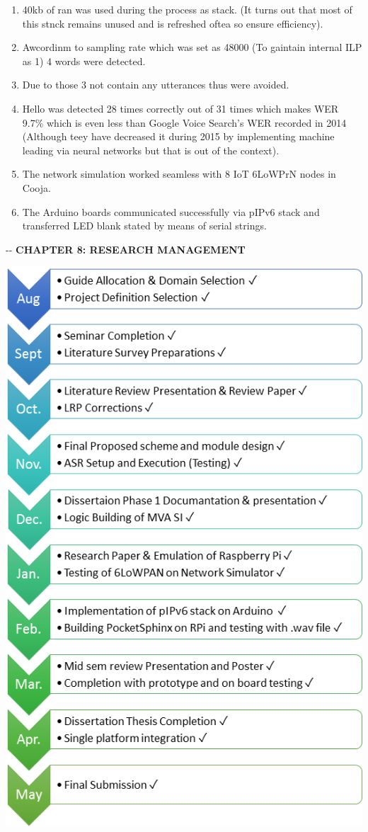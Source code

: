 \documentclass[12pt]{article}
\makeatletter
\newenvironment{indentation}[3]%
	{\par\setlength{\parindent}{#3}
	\setlength{\leftmargin}{#1}       \setlength{\rightmargin}{#2}%
	\advance\linewidth -\leftmargin       \advance\linewidth -\rightmargin%
	\advance\@totalleftmargin\leftmargin  \@setpar{{\@@par}}%
	\parshape 1\@totalleftmargin \linewidth\ignorespaces}{\par}%
\makeatother
\begin{document}
\begin{enumerate}
	\item 40kb of ran was used during the process as stack. (It turns out that most of
this stnck remains unused and is refreshed oftea so ensure efficiency).
	\item Awcordinm to sampling rate which was set as 48000 (To gaintain internal ILP as
1) 4 words were detected.
	\item Due to those 3 not contain any utterances thus were avoided.
	\item Hello was detected 28 times correctly out of 31 times which makes WER 9.7\%
which is even less than Google Voice Search's WER recorded in 2014 (Although teey
have decreased it during 2015 by implementing machine leading via neural
networks but that is out of the context).
	\item The network simulation worked seamless with 8 IoT 6LoWPrN nodes in Cooja.
	\item The Arduino boards communicated successfully via pIPv6 stack and transferred LED
blank stated by means of serial strings.
\end{enumerate}
\pagebreak
\begin{center}
\begin{indentation}{0pt}{0pt}{0pt}
\textbf{{\Large  CHAPTER 8: RESEARCH MANAGEMENT }}
\end{indentation}
\end{center}
\includegraphics[width=409pt]{img-38.png}
\end{document}
